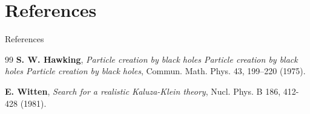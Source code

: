 
\section{References}

\begin{frame}{References}
    \small
    \begin{thebibliography}{99} 
         \textbf{S. W. Hawking}, \emph{Particle creation by black holes Particle creation by black holes Particle creation by black holes}, Commun. Math. Phys. 43, 199–220 (1975).
        
         \textbf{E. Witten}, \emph{Search for a realistic Kaluza-Klein theory}, Nucl. Phys. B 186, 412-428 (1981).
    \end{thebibliography}
    \normalsize
\end{frame}

